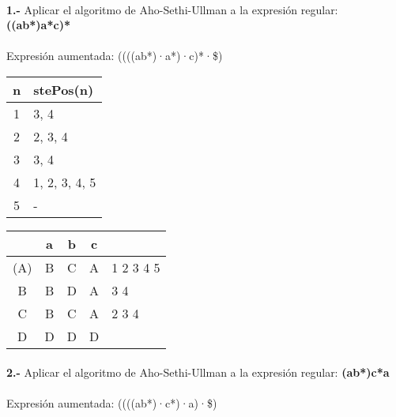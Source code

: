 \documentclass[11pt,a4paper]{report}
\begin{document}
\paragraph{}

\paragraph{}
\textbf{1.-} Aplicar el algoritmo de Aho-Sethi-Ullman a la expresión regular: \textbf{((a\textbar b*)a*c)*} \\
\\
Expresión aumentada: ((((a\textbar b*)·a*)·c)*·\$) \\

\begin{tabular} {| c | l |}
\hline
n & stePos(n) \\ \hline
1 & 3, 4 \\ \hline
2 & 2, 3, 4 \\ \hline
3 & 3, 4 \\ \hline
4 & 1, 2, 3, 4, 5 \\ \hline
5 & - \\ \hline
\end{tabular}
\quad
\begin{tabular} {| c | c |c |c | l |}
\hline 
& a & b & c & \\ \hline
(A) & B & C & A & 1 2 3 4 5 \\ \hline
B & B & D & A & 3 4 \\ \hline
C & B & C & A & 2 3 4 \\ \hline
D & D & D & D & \\ \hline
\end{tabular}\paragraph{}
\textbf{2.-} Aplicar el algoritmo de Aho-Sethi-Ullman a la expresión regular: \textbf{(a\textbar b*)c*a} \\
\\
Expresión aumentada: ((((a\textbar b*)·c*)·a)·\$) \\
\end{document}

